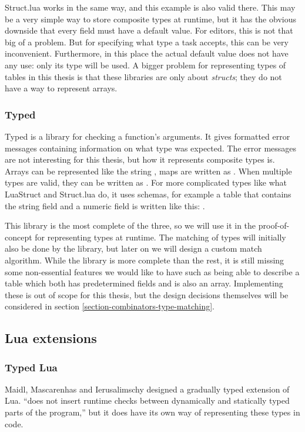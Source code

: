 Struct.lua works in the same way, and this example is also valid there. This may be a very simple way to store composite types at runtime, but it has the obvious downside that every field must have a default value. For editors, this is not that big of a problem. But for specifying what type a task accepts, this can be very inconvenient. Furthermore, in this place the actual default value does not have any use: only its type will be used. A bigger problem for representing types of tables in this thesis is that these libraries are only about \textit{structs}; they do not have a way to represent arrays.

\subsubsection{Typed}
Typed is a library for checking a function's arguments. It gives formatted error messages containing information on what type was expected. The error messages are not interesting for this thesis, but how it represents composite types is. Arrays can be represented like the string , maps are written as . When multiple types are valid, they can be written as . For more complicated types like what LuaStruct and Struct.lua do, it uses schemas, for example a table that contains the string field  and a numeric field  is written like this: .

This library is the most complete of the three, so we will use it in the proof-of-concept for representing types at runtime. The matching of types will initially also be done by the library, but later on we will design a custom match algorithm. While the library is more complete than the rest, it is still missing some non-essential features we would like to have such as being able to describe a table which both has predetermined fields and is also an array. Implementing these is out of scope for this thesis, but the design decisions themselves will be considered in section \ref{section-combinators-type-matching}.

\subsection{Lua extensions}
\subsubsection{Typed Lua}
Maidl, Mascarenhas and Ierusalimschy \cite{maidl2014typed} designed a gradually typed extension of Lua. ``does not insert runtime checks between dynamically and statically typed parts of the program,'' but it does have its own way of representing these types in code.

